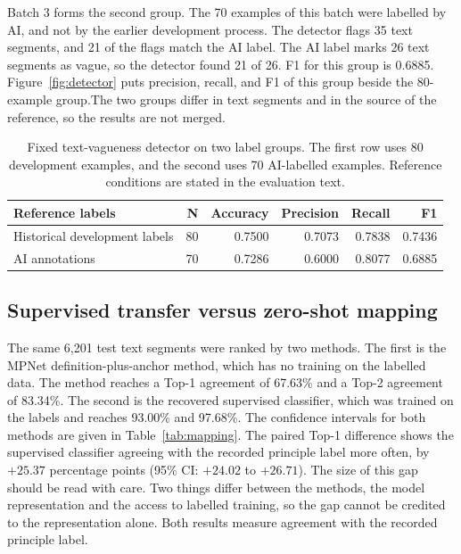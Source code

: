 Batch 3 forms the second group. The 70 examples of this batch were labelled by AI, and not by the earlier development process. The detector flags 35 text segments, and 21 of the flags match the AI label. The AI label marks 26 text segments as vague, so the detector found 21 of 26. F1 for this group is 0.6885. Figure~\ref{fig:detector} puts precision, recall, and F1 of this group beside the 80-example group.The two groups differ in text segments and in the source of the reference, so the results are not merged.

\begin{table}[tbp]
\centering\small
\caption{Fixed text-vagueness detector on two label groups. The first row uses 80 development examples, and the second uses 70 AI-labelled examples. Reference conditions are stated in the evaluation text.}
\label{tab:detector}
\begin{tabularx}{\linewidth}{@{}Yrrrrr@{}}
\toprule\textbf{Reference labels} & \textbf{N} & \textbf{Accuracy} & \textbf{Precision} & \textbf{Recall} & \textbf{F1}\\\midrule
Historical development labels & 80 & 0.7500 & 0.7073 & 0.7838 & 0.7436\\
AI annotations & 70 & 0.7286 & 0.6000 & 0.8077 & 0.6885\\\bottomrule
\end{tabularx}
\end{table}



\subsection{Supervised transfer versus zero-shot mapping}
\label{sec:eval_mapping}

The same 6,201 test text segments were ranked by two methods. The first is the MPNet definition-plus-anchor method, which has no training on the labelled data. The method reaches a Top-1 agreement of 67.63\% and a Top-2 agreement of 83.34\%. The second is the recovered supervised classifier, which was trained on the labels and reaches 93.00\% and 97.68\%. The confidence intervals for both methods are given in Table~\ref{tab:mapping}. The paired Top-1 difference shows the supervised classifier agreeing with the recorded principle label more often, by $+25.37$ percentage points (95\% CI: $+24.02$ to $+26.71$). The size of this gap should be read with care. Two things differ between the methods, the model representation and the access to labelled training, so the gap cannot be credited to the representation alone. Both results measure agreement with the recorded principle label.

